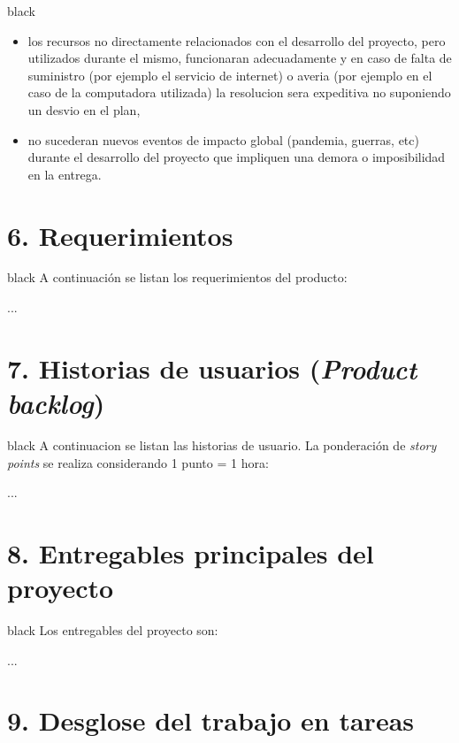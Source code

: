 \documentclass[
11pt, %
]{charter}
\begin{document}
\begin{consigna}{black}
\begin{itemize}
	\item los recursos no directamente relacionados con el desarrollo del proyecto, pero utilizados durante el mismo, funcionaran adecuadamente y en caso de falta de suministro (por ejemplo el servicio de internet) o averia (por ejemplo en el caso de la computadora utilizada) la resolucion sera expeditiva no suponiendo un desvio en el plan,
	\item no sucederan nuevos eventos de impacto global (pandemia, guerras, etc) durante el desarrollo del proyecto que impliquen una demora o imposibilidad en la entrega.
\end{itemize}


\end{consigna}

\section{6. Requerimientos}
\label{sec:requerimientos}
\begin{consigna}{black}
A continuación se listan los requerimientos del producto:

...

\end{consigna}

\section{7. Historias de usuarios (\textit{Product backlog})}
\label{sec:backlog}

\begin{consigna}{black}
A continuacion se listan las historias de usuario. La ponderación de \textit{story points} se realiza considerando 1 punto = 1 hora:

...
\end{consigna}



\section{8. Entregables principales del proyecto}
\label{sec:entregables}
\begin{consigna}{black}
Los entregables del proyecto son:

...
\end{consigna}

\section{9. Desglose del trabajo en tareas}
\label{sec:wbs}
\end{document}
